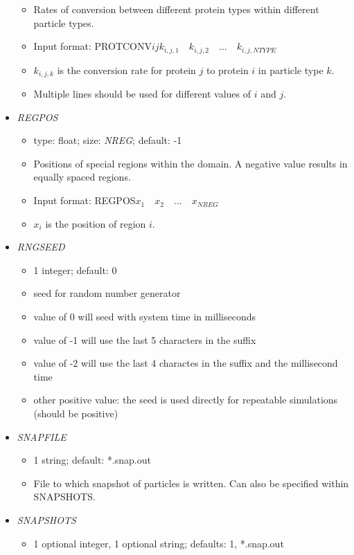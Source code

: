 \documentclass[12pt]{article}
\begin{document}
\begin{itemize}
\begin{itemize}
	\item Rates of conversion between different protein types within different particle types.
	\item Input format: PROTCONV\quad$i$\quad$j$\quad$k_{i,j,1}\quad k_{i,j,2}\quad...\quad k_{i,j,NTYPE}$
	\item $k_{i,j,k}$ is the conversion rate for protein $j$ to protein $i$ in particle type $k$.
	\item Multiple lines should be used for different values of $i$ and $j$.
\end{itemize}
%
\item {\it REGPOS}
\begin{itemize}
	\item  type: float; size: \textit{NREG}; default: -1
	\item Positions of special regions within the domain. A negative value results in equally spaced regions.
	\item Input format: REGPOS\quad$x_{1}\quad x_{2}\quad...\quad x_{NREG}$
	\item $x_{i}$ is the position of region $i$.
\end{itemize}
%    
\item {\it RNGSEED}
\begin{itemize}
	\item 1 integer; default: 0
	\item seed for random number generator
	\item value of 0 will seed with system time in milliseconds
	\item value of -1 will use the last 5 characters in the suffix
	\item value of -2 will use the last 4 charactes in the suffix and the millisecond time
	\item other positive value: the seed is used directly for repeatable simulations (should be positive)
\end{itemize}
%
\item {\it SNAPFILE}
\begin{itemize}
	\item 1 string; default: *.snap.out
	\item File to which snapshot of particles is written. Can also be specified within SNAPSHOTS.
\end{itemize}
%
\item {\it SNAPSHOTS}
  \begin{itemize}
    \item 1 optional integer, 1 optional string; defaults: 1, *.snap.out 

\end{itemize}
\end{itemize}
\end{document}
